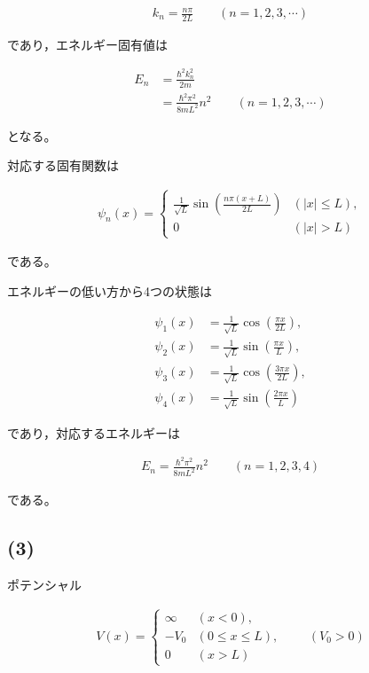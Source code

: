 \documentclass[platex,dvipdfmx,a4paper]{jsarticle}
\begin{document}
\begin{align*}
k_n
=
\frac{n\pi}{2L}
\qquad
(n=1,2,3,\cdots)
\end{align*}

であり，エネルギー固有値は

\begin{align*}
E_n
&=
\frac{\hbar^2k_n^2}{2m}\\
&=
\frac{\hbar^2\pi^2}{8mL^2}n^2
\qquad
(n=1,2,3,\cdots)
\end{align*}

となる。

対応する固有関数は

\begin{align*}
\psi_n(x)
=
\begin{cases}
\displaystyle
\frac{1}{\sqrt L}
\sin\left(
\frac{n\pi(x+L)}{2L}
\right)
&( |x|\le L),\\
0&( |x|>L)
\end{cases}
\end{align*}

である。

エネルギーの低い方から4つの状態は

\begin{align*}
\psi_1(x)
&=
\frac{1}{\sqrt L}
\cos\left(
\frac{\pi x}{2L}
\right),\\
\psi_2(x)
&=
\frac{1}{\sqrt L}
\sin\left(
\frac{\pi x}{L}
\right),\\
\psi_3(x)
&=
\frac{1}{\sqrt L}
\cos\left(
\frac{3\pi x}{2L}
\right),\\
\psi_4(x)
&=
\frac{1}{\sqrt L}
\sin\left(
\frac{2\pi x}{L}
\right)
\end{align*}

であり，対応するエネルギーは

\begin{align*}
E_n
=
\frac{\hbar^2\pi^2}{8mL^2}n^2
\qquad
(n=1,2,3,4)
\end{align*}

である。

\subsection*{(3)}

ポテンシャル

\begin{align*}
V(x)
=
\begin{cases}
\infty &(x<0),\\
-V_0 &(0\le x\le L),\\
0 &(x>L)
\end{cases}
\qquad
(V_0>0)
\end{align*}
\end{document}
